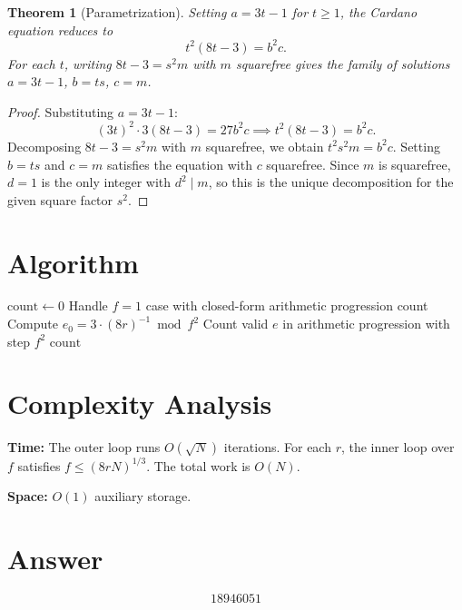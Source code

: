 \documentclass[12pt]{article}
\newtheorem{theorem}{Theorem}
\begin{document}
\begin{theorem}[Parametrization]
Setting $a = 3t - 1$ for $t \ge 1$, the Cardano equation reduces to
\[
t^2(8t-3) = b^2 c.
\]
For each $t$, writing $8t - 3 = s^2 m$ with $m$ squarefree gives the family of solutions $a = 3t-1$, $b = ts$, $c = m$.
\end{theorem}

\begin{proof}
Substituting $a = 3t - 1$:
\[
(3t)^2 \cdot 3(8t-3) = 27b^2 c \implies t^2(8t-3) = b^2 c.
\]
Decomposing $8t - 3 = s^2 m$ with $m$ squarefree, we obtain $t^2 s^2 m = b^2 c$. Setting $b = ts$ and $c = m$ satisfies the equation with $c$ squarefree. Since $m$ is squarefree, $d = 1$ is the only integer with $d^2 \mid m$, so this is the unique decomposition for the given square factor $s^2$.
\end{proof}

\section{Algorithm}

\begin{algorithmic}[1]
\State $\mathrm{count} \gets 0$
    \State Handle $f = 1$ case with closed-form arithmetic progression count
            \State Compute $e_0 = 3 \cdot (8r)^{-1} \bmod f^2$
            \State Count valid $e$ in arithmetic progression with step $f^2$
        \EndIf
    \EndFor
\EndFor
\State \Return $\mathrm{count}$
\end{algorithmic}

\section{Complexity Analysis}

\textbf{Time:} The outer loop runs $O(\sqrt{N})$ iterations. For each $r$, the inner loop over $f$ satisfies $f \le (8rN)^{1/3}$. The total work is $O(N)$.

\textbf{Space:} $O(1)$ auxiliary storage.

\section{Answer}

\[
\boxed{18946051}
\]
\end{document}

